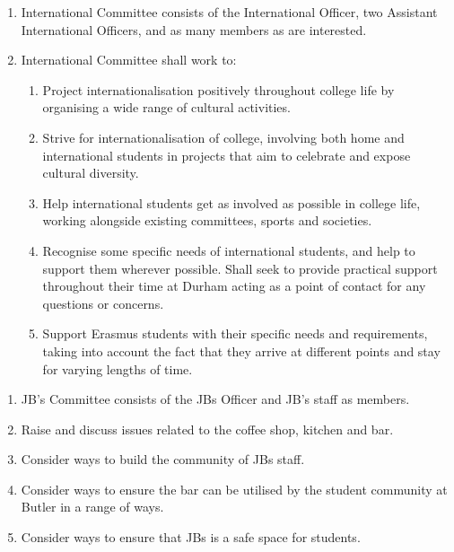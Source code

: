 
\begin{enumerate}
    \item International Committee consists of the International Officer, two Assistant International Officers, and as many members as are interested.
    \item International Committee shall work to:
    \begin{enumerate}
        \item Project internationalisation positively throughout college life by organising a wide range of cultural activities.
        \item Strive for internationalisation of college, involving both home and international students in projects that aim to celebrate and expose cultural diversity.
        \item Help international students get as involved as possible in college life, working alongside existing committees, sports and societies.
        \item Recognise some specific needs of international students, and help to support them wherever possible. Shall seek to provide practical support throughout their time at Durham acting as a point of contact for any questions or concerns.
        \item Support Erasmus students with their specific needs and requirements, taking into account the fact that they arrive at different points and stay for varying lengths of time.
    \end{enumerate}
\end{enumerate}


\begin{enumerate}
    \item  JB’s Committee consists of the JBs Officer and JB’s staff as members.
    \item Raise and discuss issues related to the coffee shop, kitchen and bar. 
    \item Consider ways to build the community of JBs staff. 
    \item Consider ways to ensure the bar can be utilised by the student community at Butler in a range of ways.
    \item Consider ways to ensure that JBs is a safe space for students.
\end{enumerate}

